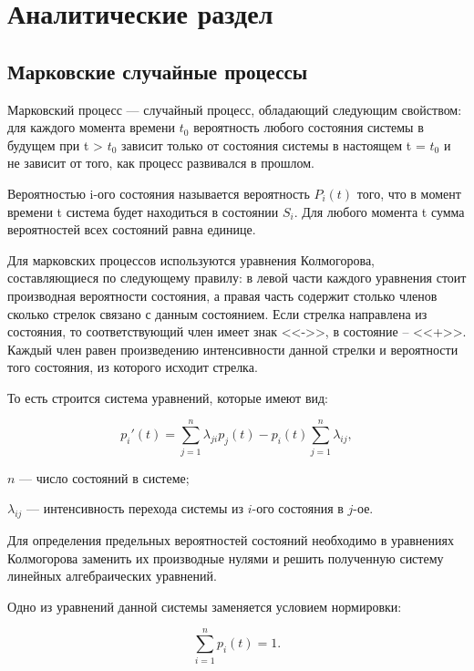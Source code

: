 \section{Аналитические раздел}

\subsection{Марковские случайные процессы}

Марковский процесс --- случайный процесс, обладающий следующим свойством:
для каждого момента времени  $t_{0}$ вероятность любого состояния  системы в будущем при t > $t_{0}$
зависит только от состояния системы в настоящем t = $t_{0}$ и не зависит от того, как процесс развивался в прошлом.

Вероятностью i-ого состояния называется вероятность $P_{i}(t)$ того,
что в момент времени t система будет находиться в состоянии $S_{i}$.
Для любого момента t сумма вероятностей всех состояний равна единице.

Для марковских процессов используются уравнения Колмогорова, составляющиеся по следующему правилу:
в левой части каждого уравнения стоит производная вероятности состояния, а правая часть содержит столько членов сколько стрелок связано с данным состоянием.
Если стрелка направлена из состояния, то соответствующий член имеет знак <<->>, в состояние -- <<+>>.
Каждый член равен произведению интенсивности данной стрелки и вероятности того состояния, из которого исходит стрелка.

То есть строится система уравнений, которые имеют вид:

\begin{equation}
	p_i'(t) = \sum\limits_{j=1}^{n} \lambda_{ji}p_j(t) - p_i(t)
	\sum\limits_{j=1}^{n} \lambda_{ij},
\end{equation}

$n$ --- число состояний в системе;

$\lambda_{ij}$ --- интенсивность перехода системы из $i$-ого состояния в $j$-ое.

Для определения предельных вероятностей состояний необходимо в уравнениях Колмогорова заменить их производные нулями и решить полученную систему линейных алгебраических уравнений.

Одно из уравнений данной системы заменяется условием нормировки:

\begin{equation}
	\sum\limits_{i=1}^{n} p_i(t) = 1.
\end{equation}

